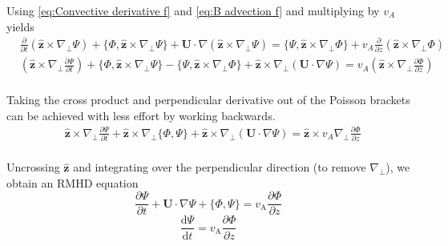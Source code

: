 Using \eqref{eq:Convective derivative f} and \eqref{eq:B advection f} and multiplying by \(v_A\) yields
\begin{equation*}
 \begin{split}
      &\frac{\partial}{\partial t} (\hat{\boldsymbol{z}} \times \nabla_{\perp} \Psi) + \{\Phi, \hat{\boldsymbol{z}} \times \nabla_{\perp} \Psi\} + \boldsymbol{U}\cdot \nabla (\hat{\boldsymbol{z}} \times \nabla_{\perp} \Psi) =  \{\Psi, \hat{\boldsymbol{z}} \times \nabla_{\perp} \Phi\} + v_A\frac{\partial}{\partial z} (\hat{\boldsymbol{z}} \times \nabla_{\perp} \Phi)  \\ 
     & \left(\hat{\boldsymbol{z}} \times \nabla_{\perp} \frac{\partial\Psi}{\partial t}\right) + \{\Phi, \hat{\boldsymbol{z}} \times \nabla_{\perp} \Psi\}- \{\Psi, \hat{\boldsymbol{z}} \times \nabla_{\perp} \Phi\} + \hat{\boldsymbol{z}} \times \nabla_{\perp}(\boldsymbol{U}\cdot \nabla\Psi) =  v_A \left(\hat{\boldsymbol{z}} \times \nabla_{\perp} \frac{\partial \Phi}{\partial z}\right)\\ 
 \end{split}
\end{equation*}

Taking the cross product and perpendicular derivative out of the Poisson brackets can be achieved with less effort by working backwards.
\begin{equation*}
 \begin{split} 
     & \hat{\boldsymbol{z}} \times \nabla_{\perp} \frac{\partial \Psi}{\partial t} + \hat{\boldsymbol{z}} \times \nabla_{\perp} \{\Phi, \Psi\} + \hat{\boldsymbol{z}} \times \nabla_{\perp}(\boldsymbol{U}\cdot \nabla \Psi) =  \hat{\boldsymbol{z}} \times v_A\nabla_{\perp} \frac{\partial \Phi}{\partial z} \\ 
 \end{split}
\end{equation*}

Uncrossing \(\hat{\boldsymbol{z}}\) and integrating over the perpendicular direction (to remove \(\nabla_{\perp}\)), we obtain an RMHD equation
\begin{equation*}
    \frac{\partial \Psi}{\partial t} +\boldsymbol{U}\cdot \nabla \Psi+ \{\Phi, \Psi\} = v_{\mathrm{A}} \frac{\partial \Phi}{\partial z}
\end{equation*}
\begin{equation}
    \label{eq:RMHD Induction}
    \frac{\mathrm{d} \Psi}{\mathrm{d} t} = v_{\mathrm{A}} \frac{\partial \Phi}{\partial z}
\end{equation}

